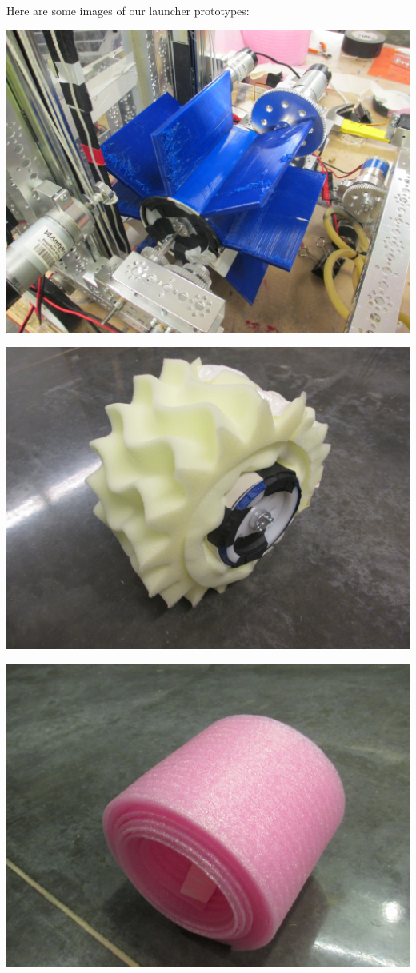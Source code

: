 Here are some images of our launcher prototypes:

\begin{center}
 \includegraphics[width=\textwidth]{./Entries/Images/launchProto7.JPG}

 \includegraphics[width=\textwidth]{./Entries/Images/launchProto2.JPG}

 \includegraphics[width=\textwidth]{./Entries/Images/launchProto12.JPG}
\end{center}

